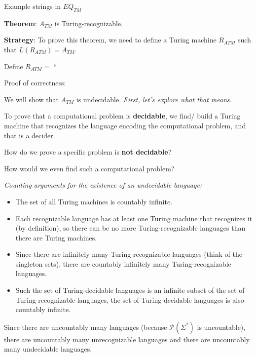 \documentclass[12pt, oneside]{article}
\begin{document}
    Example strings in  $EQ_{TM}$
    
    \vfill
    
    \newpage
    
    {\bf  Theorem}: $A_{TM}$  is  Turing-recognizable.
    
    
    {\bf  Strategy}:  To prove this theorem, we need  to  define  a Turing  machine  $R_{ATM}$ such that 
    $L(R_{ATM}) = A_{TM}$.
    
    
    Define $R_{ATM} =  $ ``
    
    \vspace{150pt}
    
    
    Proof of correctness: 
    
    
    \vfill
    \vfill
    
    We will show that $A_{TM}$ is undecidable.   {\it First, let's explore what that means.}
    
    \newpage
    
    To prove that a computational problem is {\bf decidable}, we find/ build a Turing 
    machine that recognizes the language encoding the computational problem, and that 
    is a decider.
    
    
    How do we prove a specific problem is {\bf not decidable}?
    
    How would we even find such a computational problem?
    
    
    {\it Counting arguments for the existence of an undecidable language:}
    \begin{itemize}
        \item The set of all Turing machines is countably infinite.
        \item Each recognizable language has at least one Turing machine that recognizes it (by definition), 
        so there can be no more Turing-recognizable
        languages than there are Turing machines. 
        \item Since there are infinitely many Turing-recognizable languages
        (think of the singleton sets), there are countably infinitely 
        many Turing-recognizable languages.
        \item Such the set of Turing-decidable languages is an infinite subset 
        of the set of Turing-recognizable languages, the set of 
        Turing-decidable languages is also countably infinite.
    \end{itemize}
    
    Since there are uncountably many languages (because $\mathcal{P}(\Sigma^*)$
    is uncountable), there are uncountably many unrecognizable languages
    and there are uncountably many undecidable languages.
    
\end{document}
